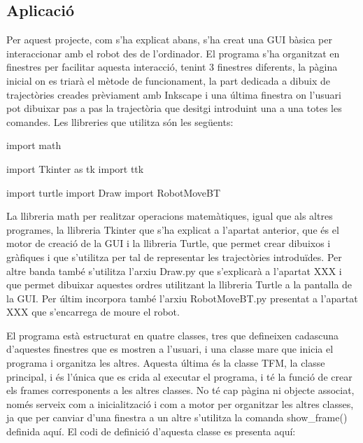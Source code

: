 \subsection{Aplicació}
Per aquest projecte, com s’ha explicat abans, s’ha creat una GUI bàsica per interaccionar amb el robot des de l’ordinador. El programa s’ha organitzat en finestres per facilitar aquesta interacció, tenint 3 finestres diferents, la pàgina inicial on es triarà el mètode de funcionament, la part dedicada a dibuix de trajectòries creades prèviament amb Inkscape i una última finestra on l’usuari pot dibuixar pas a pas la trajectòria que desitgi introduint una a una totes les comandes.
Les llibreries que utilitza són les següents:

\begin{python}
	import math
	
	import Tkinter as tk
	import ttk
	
	import turtle
	import Draw
	import RobotMoveBT
\end{python}

La llibreria math per realitzar operacions matemàtiques, igual que als altres programes, la llibreria Tkinter que s’ha explicat a l’apartat anterior, que és el motor de creació de la GUI i la llibreria Turtle, que permet crear dibuixos i gràfiques i que s’utilitza per tal de representar les trajectòries introduïdes. Per altre banda també s’utilitza l’arxiu Draw.py que s’explicarà a l’apartat XXX i que permet dibuixar aquestes ordres utilitzant la llibreria Turtle a la pantalla de la GUI.  Per últim incorpora també l’arxiu RobotMoveBT.py presentat a l’apartat XXX que s’encarrega de moure el robot. 

El programa està estructurat en quatre classes, tres que defineixen cadascuna d’aquestes finestres que es mostren a l’usuari, i una classe mare que inicia el programa i organitza les altres. Aquesta última és la classe TFM, la classe principal, i és l’única que es crida al executar el programa, i té la funció de crear els frames corresponents a les altres classes. No té cap pàgina ni objecte associat, només serveix com a inicialització i com a motor per organitzar les altres classes, ja que per canviar d’una finestra a un altre s’utilitza la comanda show\_frame() definida aquí. El codi de definició d’aquesta classe es presenta aquí:

